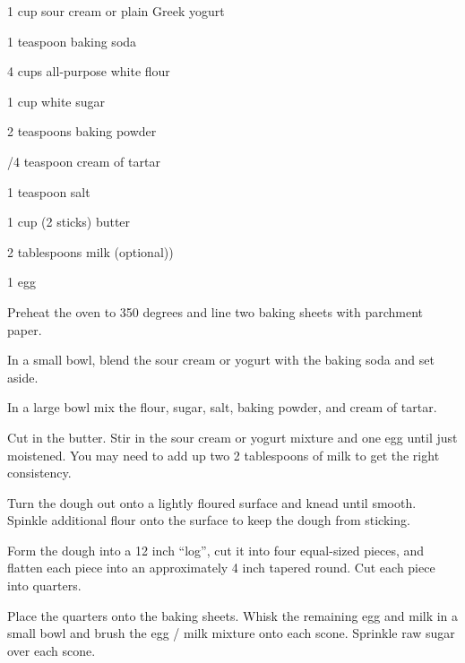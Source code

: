 \begin{IngredientsAndSteps}
      \ListIngredientsAndSteps
      {
            1 cup sour cream or plain Greek yogurt

            1 teaspoon baking soda

            4 cups all-purpose white flour

            1 cup white sugar

            2 teaspoons baking powder

            /4 teaspoon cream of tartar

            1 teaspoon salt

            1 cup (2 sticks) butter

            2 tablespoons milk (optional))

            1 egg
      }
      {
            Preheat the oven to 350 degrees and line two baking sheets with parchment paper.

            In a small bowl, blend the sour cream or yogurt with the baking soda and set aside.

            In a large bowl mix the flour, sugar, salt, baking powder, and cream of tartar.

            Cut in the butter. Stir in the sour cream or yogurt mixture and one egg until just moistened.
            You may need to add up two 2 tablespoons of milk to get the right consistency.

            Turn the dough out onto a lightly floured surface and knead until smooth. Spinkle additional
            flour onto the surface to keep the dough from sticking.

            Form the dough into a 12 inch ``log'', cut it into four equal-sized pieces, and flatten
            each piece into an approximately 4 inch tapered round. Cut each piece into quarters.

            Place the quarters onto the baking sheets. Whisk the remaining egg and milk in a small bowl
            and brush the egg / milk mixture onto each scone. Sprinkle raw sugar over each scone.
      }

      {}
\end{IngredientsAndSteps}


